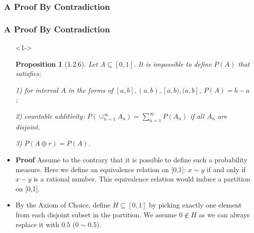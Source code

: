 \documentclass[handout]{beamer}
\newtheorem{Proposition}[theorem]{Proposition}
\begin{document}
\subsubsection{A Proof By Contradiction}

\frame
{
  \frametitle{A Proof By Contradiction}

   \begin{itemize}

      
   \item[]<1-> \begin{Proposition}[1.2.6] Let $A \subseteq [0,1]$. It is impossible to define $P(A)$ that satisfies:  
   
   1) for interval $A$ in the forms of $[a,b], (a,b), [a,b),(a, b]$, $P( A)=b-a$; 
   
   2) countable additivity: $P(\cup_{n=1}^{\infty} A_n)=\sum_{n=1}^{\infty} P(A_n)$ if all $A_n$ are disjoint. 
   
   3) $P(A\oplus r)=P(A)$. \end{Proposition} 
      \item<2->\textbf{Proof} Assume to the contrary that it is possible to define such a probability measure. Here we define an equivalence relation on [0,1]: $x\sim y$ if and only if  $x-y$ is a rational number. This equivalence relation would induce a partition on [0,1]. 
      
      \item<3-> By the Axiom of Choice, define $H \subseteq [0,1]$ by picking exactly one element from each disjoint subset in the partition. We assume $0\not\in H$ as we can always replace it with $0.5$ ($0\sim 0.5$). 
       
  \end{itemize}
}
\end{document}
